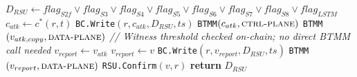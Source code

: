 \documentclass[12pt, a4paper]{report}
\begin{document}
\begin{algorithm}[H]
\begin{algorithmic}[1]
  \State $D_{RSU} \gets flag_{S2f}\lor flag_{S3}
         \lor flag_{S4}\lor flag_{S5}\lor flag_{S6}
         \lor flag_{S7}\lor flag_{S8}\lor flag_{LSTM}$
      \State $c_{atk} \gets c^*(r,t)$
             \hfill{}
      \State \texttt{BC.Write}$(r,c_{atk},D_{RSU},ts)$
      \State \texttt{BTMM}$(c_{atk},
             \textsc{ctrl-plane})$
             \hfill{}
        \State \texttt{BTMM}$(v_{atk,copy},
               \textsc{data-plane})$
               \hfill{}
      \EndIf
        \State \textit{// Witness threshold checked
               on-chain; no direct BTMM call needed}
      \EndIf
    \Else
      \hfill{}
        \State $v_{report} \gets v_{atk}$
      \Else
        \State $v_{report} \gets v$
      \EndIf
      \State \texttt{BC.Write}$(r,v_{report},
             D_{RSU},ts)$
      \State \texttt{BTMM}$(v_{report},
             \textsc{data-plane})$
    \EndIf
    \State \texttt{RSU.Confirm}$(v,r)$
           \hfill{}
  \EndIf
  \State \textbf{return} $D_{RSU}$
\EndProcedure
\end{algorithmic}
\label{alg:lrad_rsu}
\end{algorithm}
\end{document}
